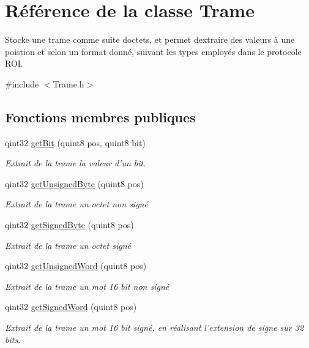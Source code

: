 \hypertarget{class_trame}{}\section{Référence de la classe Trame}
\label{class_trame}


Stocke une trame comme suite d\textquotesingle{}octets, et permet d\textquotesingle{}extraire des valeurs à une poistion et selon un format donné, suivant les types employés dans le protocole R\+OI.  




{\ttfamily \#include $<$Trame.\+h$>$}

\subsection*{Fonctions membres publiques}
\begin{DoxyCompactItemize}
\item 
qint32 \hyperlink{class_trame_a4f27e756e28a3f6031266b2915ad8f5f}{get\+Bit} (quint8 pos, quint8 bit)
\begin{DoxyCompactList}\small\item\em Extrait de la trame la valeur d’un bit. \end{DoxyCompactList}\item 
qint32 \hyperlink{class_trame_a9ad6bf3df1cf43d66571df3db1018056}{get\+Unsigned\+Byte} (quint8 pos)
\begin{DoxyCompactList}\small\item\em Extrait de la trame un octet non signé \end{DoxyCompactList}\item 
qint32 \hyperlink{class_trame_a183f007c20410a5c0cbf2093a02e42f8}{get\+Signed\+Byte} (quint8 pos)
\begin{DoxyCompactList}\small\item\em Extrait de la trame un octet signé \end{DoxyCompactList}\item 
qint32 \hyperlink{class_trame_acedfebffa3d8af24219e5460d4f597de}{get\+Unsigned\+Word} (quint8 pos)
\begin{DoxyCompactList}\small\item\em Extrait de la trame un mot 16 bit non signé \end{DoxyCompactList}\item 
qint32 \hyperlink{class_trame_afcb503453b50b388035e3c4ae0b606b9}{get\+Signed\+Word} (quint8 pos)
\begin{DoxyCompactList}\small\item\em Extrait de la trame un mot 16 bit signé, en réalisant l’extension de signe sur 32 bits. \end{DoxyCompactList}\end{DoxyCompactItemize}


